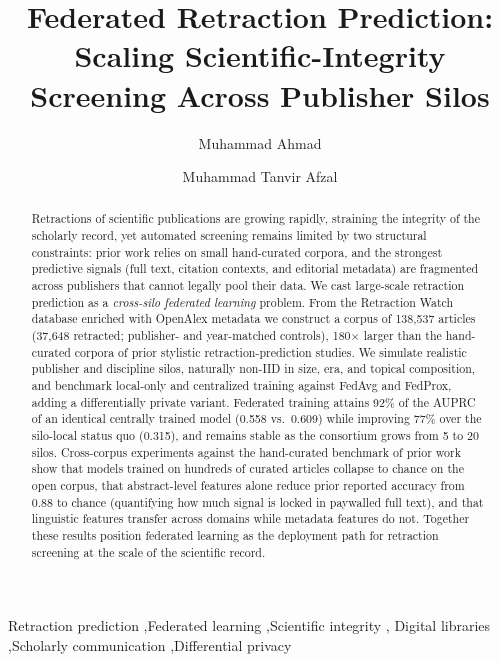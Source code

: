 \documentclass[review,12pt]{elsarticle}
\begin{document}
\begin{frontmatter}

\title{Federated Retraction Prediction: Scaling Scientific-Integrity
Screening Across Publisher Silos}

\author[gisma]{Muhammad Ahmad}
\author[gisma]{Muhammad Tanvir Afzal}

\begin{abstract}
Retractions of scientific publications are growing rapidly, straining the
integrity of the scholarly record, yet automated screening remains limited by
two structural constraints: prior work relies on small hand-curated corpora,
and the strongest predictive signals (full text, citation contexts, and
editorial metadata) are fragmented across publishers that cannot legally pool
their data. We cast large-scale retraction prediction as a \emph{cross-silo
federated learning} problem. From the Retraction Watch database enriched with
OpenAlex metadata we construct a corpus of 138{,}537 articles (37{,}648
retracted; publisher- and year-matched controls), 180$\times$ larger than the
hand-curated corpora of prior stylistic retraction-prediction studies. We
simulate realistic
publisher and discipline silos, naturally non-IID in size, era, and topical
composition, and benchmark local-only and centralized training against FedAvg
and FedProx, adding a differentially private variant. Federated training
attains 92\% of the AUPRC of an identical centrally trained model (0.558 vs.\
0.609) while improving 77\% over the silo-local status quo (0.315), and remains
stable as the consortium grows from 5 to 20 silos. Cross-corpus experiments
against the hand-curated benchmark of prior work show that models trained on
hundreds of curated articles collapse to chance on the open corpus, that
abstract-level features alone reduce prior reported accuracy from 0.88 to
chance (quantifying how much signal is locked in paywalled full text), and that
linguistic features transfer across domains while metadata features do not.
Together these results position federated learning as the deployment path for
retraction screening at the scale of the scientific record.
\end{abstract}

\begin{keyword}
Retraction prediction \sep Federated learning \sep Scientific integrity \sep
Digital libraries \sep Scholarly communication \sep Differential privacy
\end{keyword}

\end{frontmatter}
\end{document}
